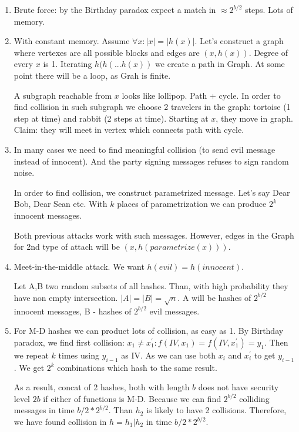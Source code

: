 \begin{enumerate}
	\item Brute force: by the Birthday paradox expect a match in $\approx 2^{b/2}$ steps. Lots of memory.
	\item With constant memory. Assume $\forall x: |x| = |h(x)|$.
		Let's construct a graph where vertexes are all possible blocks and edges are $(x, h(x))$.
		Degree of every $x$ is 1. Iterating $h(h(... h(x))$ we create a path in Graph.
		At some point there will be a loop, as Grah is finite.

		A subgraph reachable from $x$ looks like lollipop. Path + cycle.
		In order to find collision in such subgraph we choose 2 travelers in the graph: tortoise (1 step at time) and rabbit (2 steps at time).
		Starting at $x$, they move in graph. Claim: they will meet in vertex which connects path with cycle.
	\item In many cases we need to find meaningful collision (to send evil message instead of innocent).
		And the party signing messages refuses to sign random noise.

		In order to find collision, we construct parametrized message. Let's say Dear Bob, Dear Sean etc.
		With $k$ places of parametrization we can produce $2^k$ innocent messages.

		Both previous attacks work with such messages. However, edges in the Graph for 2nd type of attach will be $(x, h(parametrize(x)))$.
	\item Meet-in-the-middle attack. We want $h(evil) = h(innocent)$.

		Let A,B two random subsets of all hashes. Than, with high probability they have non empty intersection. $|A| = |B| = \sqrt{n}$.
		A will be hashes of $2^{b/2}$ innocent messages, B - hashes of $2^{b/2}$ evil messages.
	\item For M-D hashes we can product lots of collision, as easy as 1.
		By Birthday paradox, we find first collision: $x_1 \neq x_1^{\prime}: f(IV, x_1) = f(IV, x_1^{\prime}) = y_1$.
		Then we repeat $k$ times using $y_{i-1}$ as IV. As we can use both $x_i$ and $x_i^{\prime}$ to get $y_{i-1}$.
		We get $2^k$ combinations which hash to the same result.

		As a result, concat of 2 hashes, both with length $b$ does not have security level $2b$ if either of functions is M-D.
		Because we can find $2^{b/2}$ colliding messages in time $b/2 * 2^{b/2}$. Than $h_2$ is likely to have 2 collisions.
		Therefore, we have found collision in $h = h_1 | h_2$ in time $b/2 * 2^{b/2}$.
\end{enumerate}

